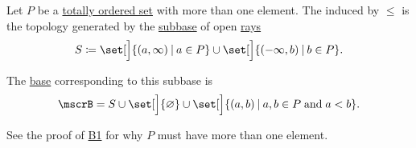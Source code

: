 \begin{definition}\label{def:order_topology}
  Let \( P \) be a \hyperref[def:partially_ordered_set]{totally ordered set} with more than one element. The  induced by \( \leq \) is the topology generated by the \hyperref[def:topological_subbase]{subbase} of open \hyperref[def:partially_ordered_set_interval/ray]{rays}
  \begin{equation}\label{eq:def:order_topology/subbase}
    S \coloneqq \set[\Big]{ (a, \infty) \given a \in P } \cup \set[\Big]{ (-\infty, b) \given b \in P }.
  \end{equation}

  The \hyperref[def:topological_base]{base} corresponding to this subbase is
  \begin{equation}\label{eq:def:order_topology/base}
    \mscrB = S \cup \set[\Big]{ \varnothing } \cup \set[\Big]{ (a, b) \given a, b \in P \T{and} a < b }.
  \end{equation}

  See the proof of \hyperref[thm:topology_from_base/B1]{B1} for why \( P \) must have more than one element.
\end{definition}
